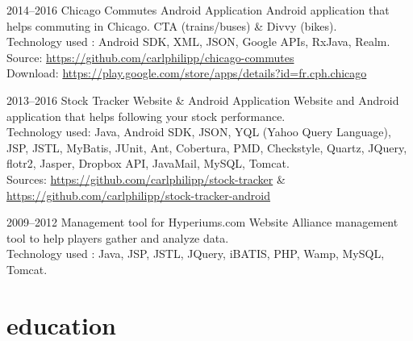 \documentclass[]{friggeri-cv} %
\begin{document}
\begin{entrylist}

\entry
{2014--2016}
{}
{Chicago Commutes}
{  Android Application}
{}
{Android application that helps commuting in Chicago. CTA (trains/buses) \& Divvy (bikes).\\
Technology used : Android SDK, XML, JSON, Google APIs, RxJava, Realm.\\
\footnotesize{Source: \href{https://github.com/carlphilipp/chicago-commutes}{https://github.com/carlphilipp/chicago-commutes}}\\
\footnotesize{Download: \href{https://play.google.com/store/apps/details?id=fr.cph.chicago}{https://play.google.com/store/apps/details?id=fr.cph.chicago}}}

\end{entrylist}

\begin{entrylist}

\entry
{2013--2016}
{}
{Stock Tracker}
{  Website \& Android Application}
{}
{Website and Android application that helps following your stock performance.\\
Technology used: Java, Android SDK, JSON, YQL (Yahoo Query Language), JSP, JSTL, MyBatis,
JUnit, Ant, Cobertura, PMD, Checkstyle, Quartz, JQuery, flotr2, Jasper, Dropbox API, JavaMail,
MySQL, Tomcat.\\
\footnotesize{Sources: \href{https://github.com/carlphilipp/stock-tracker}{https://github.com/carlphilipp/stock-tracker} \& \href{https://github.com/carlphilipp/stock-tracker}{https://github.com/carlphilipp/stock-tracker-android}}}

\end{entrylist}

\begin{entrylist}

\entry
{2009--2012}
{}
{Management tool for Hyperiums.com}
{Website}
{}
{Alliance management tool to help players gather and analyze data.\\
Technology used : Java, JSP, JSTL, JQuery, iBATIS, PHP, Wamp, MySQL, Tomcat.}

\end{entrylist}


\section{education}
\end{document}
